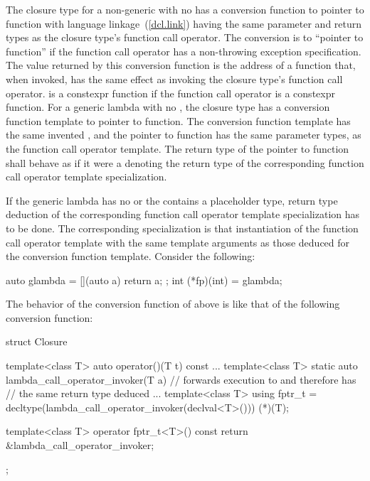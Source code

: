 \pnum
The closure type for a non-generic  with no
has a conversion function to pointer to
function with \Cpp language linkage~(\ref{dcl.link}) having
the same parameter and return types as the closure type's function call operator.
The conversion is to ``pointer to  function''
if the function call operator
has a non-throwing exception specification.
The value returned by this conversion function
is the address of a function  that, when invoked,
has the same effect as invoking the closure type's function call operator.
 is a constexpr function
if the function call operator is a constexpr function.
For a generic lambda with no , the closure type has a
conversion function template to
pointer to function. The conversion function template has the same invented
, and the pointer to function has the same
parameter types, as the function call operator template.  The return type of
the pointer to function shall behave as if it were a
 denoting the return type of the corresponding
function call operator template specialization.
\begin{note}
If the generic lambda has no  or
the  contains a placeholder type, return type
deduction of the corresponding function call operator template specialization
has to be done. The corresponding specialization is that instantiation of the
function call operator template with the same template arguments as those
deduced for the conversion function template.  Consider the following:
\begin{codeblock}
auto glambda = [](auto a) { return a; };
int (*fp)(int) = glambda;
\end{codeblock}
The behavior of the conversion function of  above is like
that of the following conversion function:
\begin{codeblock}
struct Closure {
  template<class T> auto operator()(T t) const { ... }
  template<class T> static auto lambda_call_operator_invoker(T a) {
    // forwards execution to  and therefore has
    // the same return type deduced
    ...
  }
  template<class T> using fptr_t =
     decltype(lambda_call_operator_invoker(declval<T>())) (*)(T);

  template<class T> operator fptr_t<T>() const
    { return &lambda_call_operator_invoker; }
};
\end{codeblock}
\end{note}

